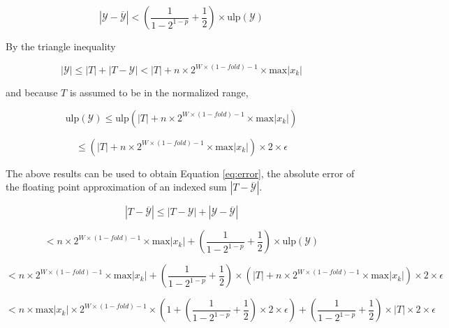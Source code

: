 \documentclass[12pt]{article}
\providecommand{\max}{\ensuremath{\text{max}}}
\providecommand{\ulp}{\ensuremath{\text{ulp}}}
\theoremstyle{plain}
\numberwithin{equation}{section}
\begin{document}
    \begin{equation*}
      |\mathcal{Y} - \overline{\mathcal{Y}}| < (\frac{1}{1 - 2^{1 - p}} + \frac{1}{2})\times \ulp(\mathcal{Y})
    \end{equation*}

    By the triangle inequality

    \begin{equation*}
      |\mathcal{Y}| \leq |T| + |T - \mathcal{Y}| < |T| + n \times 2^{W \times (1 - fold) - 1} \times \max|x_k|
    \end{equation*}

    and because $T$ is assumed to be in the normalized range,

    \begin{equation*}
      \ulp(\mathcal{Y}) \leq \ulp(|T| + n \times 2^{W \times (1 - fold) - 1} \times \max|x_k|)
    \end{equation*}

    \begin{equation*}
    \leq (|T| + n \times 2^{W \times (1 - fold) - 1} \times \max|x_k|) \times 2 \times \epsilon
    \end{equation*}

    The above results can be used to obtain Equation \ref{eq:error}, the absolute error of the floating point approximation of an indexed sum $|T - \overline{\mathcal{Y}}|$.

    \begin{equation*}
      |T - \overline{\mathcal{Y}}| \leq |T - \mathcal{Y}| + |\mathcal{Y} - \overline{\mathcal{Y}}|
    \end{equation*}

    \begin{equation*}
      < n \times 2^{W \times (1 - fold) - 1} \times \max|x_k| + (\frac{1}{1 - 2^{1 - p}} + \frac{1}{2})\times \ulp(\mathcal{Y})
    \end{equation*}

    \begin{equation*}
      < n \times 2^{W \times (1 - fold) - 1} \times \max|x_k| + (\frac{1}{1 - 2^{1 - p}} + \frac{1}{2})\times(|T| + n \times 2^{W \times (1 - fold) - 1} \times \max|x_k|) \times 2 \times \epsilon
    \end{equation*}

    \begin{equation}
      < n \times \max|x_k|\times 2^{W \times (1 - fold) - 1} \times(1 + (\frac{1}{1 - 2^{1 - p}} + \frac{1}{2}) \times 2 \times \epsilon) + (\frac{1}{1 - 2^{1 - p}} + \frac{1}{2})\times |T| \times 2 \times \epsilon
      \label{eq:error}
    \end{equation}
\end{document}
